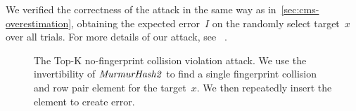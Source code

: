 We verified the correctness of the attack in the same way as in~\cref{sec:cms-overestimation}, obtaining the expected error~$I$  on the randomly select target~$x$ over all trials. For more details of our attack, see ~.

\begin{figure}[h]
    \centering
    \begin{pcvstack}
    \end{pcvstack}	
\caption[Redis TK NFC Violation Attack.]{The Top-K no-fingerprint collision violation attack. We use the invertibility of $\mathit{MurmurHash2}$ to find a single fingerprint collision and row pair element for the target~$x$. We then repeatedly insert the element to create error.}\label{fig:tk-nfc-attack}
\end{figure}